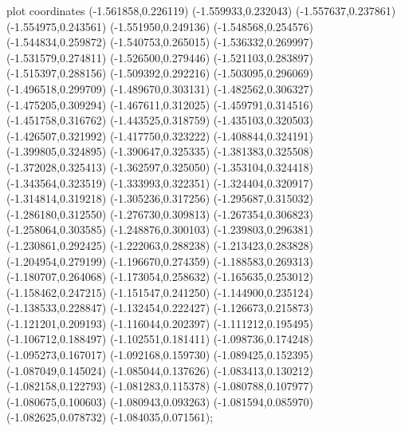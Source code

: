 { plot coordinates {(-1.561858,0.226119) (-1.559933,0.232043) (-1.557637,0.237861) (-1.554975,0.243561) (-1.551950,0.249136) (-1.548568,0.254576) (-1.544834,0.259872) (-1.540753,0.265015) (-1.536332,0.269997) (-1.531579,0.274811) (-1.526500,0.279446) (-1.521103,0.283897) (-1.515397,0.288156) (-1.509392,0.292216) (-1.503095,0.296069) (-1.496518,0.299709) (-1.489670,0.303131) (-1.482562,0.306327) (-1.475205,0.309294) (-1.467611,0.312025) (-1.459791,0.314516) (-1.451758,0.316762) (-1.443525,0.318759) (-1.435103,0.320503) (-1.426507,0.321992) (-1.417750,0.323222) (-1.408844,0.324191) (-1.399805,0.324895) (-1.390647,0.325335) (-1.381383,0.325508) (-1.372028,0.325413) (-1.362597,0.325050) (-1.353104,0.324418) (-1.343564,0.323519) (-1.333993,0.322351) (-1.324404,0.320917) (-1.314814,0.319218) (-1.305236,0.317256) (-1.295687,0.315032) (-1.286180,0.312550) (-1.276730,0.309813) (-1.267354,0.306823) (-1.258064,0.303585) (-1.248876,0.300103) (-1.239803,0.296381) (-1.230861,0.292425) (-1.222063,0.288238) (-1.213423,0.283828) (-1.204954,0.279199) (-1.196670,0.274359) (-1.188583,0.269313) (-1.180707,0.264068) (-1.173054,0.258632) (-1.165635,0.253012) (-1.158462,0.247215) (-1.151547,0.241250) (-1.144900,0.235124) (-1.138533,0.228847) (-1.132454,0.222427) (-1.126673,0.215873) (-1.121201,0.209193) (-1.116044,0.202397) (-1.111212,0.195495) (-1.106712,0.188497) (-1.102551,0.181411) (-1.098736,0.174248) (-1.095273,0.167017) (-1.092168,0.159730) (-1.089425,0.152395) (-1.087049,0.145024) (-1.085044,0.137626) (-1.083413,0.130212) (-1.082158,0.122793) (-1.081283,0.115378) (-1.080788,0.107977) (-1.080675,0.100603) (-1.080943,0.093263) (-1.081594,0.085970) (-1.082625,0.078732) (-1.084035,0.071561)};
}
